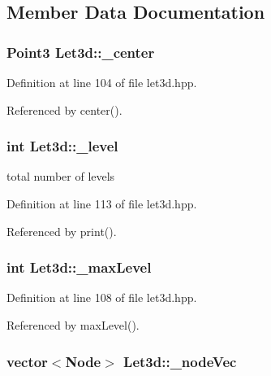 \subsection{Member Data Documentation}
\subsubsection{\setlength{\rightskip}{0pt plus 5cm}Point3 {\bf Let3d::\_\-center}\hspace{0.3cm}{\tt  [protected]}}\label{classLet3d_391969e82e332503da2a0d69072f0229_391969e82e332503da2a0d69072f0229}




Definition at line 104 of file let3d.hpp.

Referenced by center().
\subsubsection{\setlength{\rightskip}{0pt plus 5cm}int {\bf Let3d::\_\-level}\hspace{0.3cm}{\tt  [protected]}}\label{classLet3d_cc2cd62901d4033974b1e819cf85cec7_cc2cd62901d4033974b1e819cf85cec7}


total number of levels 

Definition at line 113 of file let3d.hpp.

Referenced by print().
\subsubsection{\setlength{\rightskip}{0pt plus 5cm}int {\bf Let3d::\_\-max\-Level}\hspace{0.3cm}{\tt  [protected]}}\label{classLet3d_3e92a4eebba860cc90434cef274b4081_3e92a4eebba860cc90434cef274b4081}




Definition at line 108 of file let3d.hpp.

Referenced by max\-Level().
\subsubsection{\setlength{\rightskip}{0pt plus 5cm}vector$<${\bf Node}$>$ {\bf Let3d::\_\-node\-Vec}\hspace{0.3cm}{\tt  [protected]}}\label{classLet3d_0dca3d8b42eecae5aeb38ed9545698e8_0dca3d8b42eecae5aeb38ed9545698e8}




